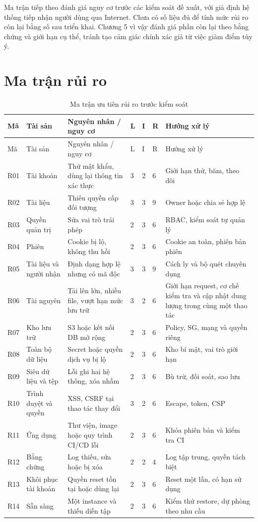 Ma trận tiếp theo đánh giá nguy cơ trước các kiểm soát đề xuất, với giả định hệ thống tiếp nhận người dùng qua Internet. Chưa có số liệu đủ để tính mức rủi ro còn lại bằng số sau triển khai. Chương 5 vì vậy đánh giá phần còn lại theo bằng chứng và giới hạn cụ thể, tránh tạo cảm giác chính xác giả từ việc giảm điểm tùy ý.

\section{Ma trận rủi ro}
{\small
\begin{longtable}{P{.8cm}P{2.7cm}P{4.2cm}P{.5cm}P{.5cm}P{.5cm}P{3.5cm}}
\caption{Ma trận ưu tiên rủi ro trước kiểm soát}\label{tab:risk}\\
\toprule Mã & Tài sản & Nguyên nhân / nguy cơ & L & I & R & Hướng xử lý\\\midrule\endfirsthead
\toprule Mã & Tài sản & Nguyên nhân / nguy cơ & L & I & R & Hướng xử lý\\\midrule\endhead
R01 & Tài khoản & Thử mật khẩu, dùng lại thông tin xác thực & 3&2&6&Giới hạn thử, băm, theo dõi\\
R02 & Tài liệu & Thiếu quyền cấp đối tượng & 3&3&9&Owner hoặc chia sẻ hợp lệ\\
R03 & Quyền quản trị & Sửa vai trò trái phép & 2&3&6&RBAC, kiểm soát tự quản lý\\
R04 & Phiên & Cookie bị lộ, không thu hồi & 2&3&6&Cookie an toàn, phiên bản phiên\\
R05 & Tài liệu và người nhận & Định dạng hợp lệ nhưng có mã độc & 3&3&9&Cách ly và bộ quét chuyên dụng\\
R06 & Tài nguyên & Tải lên lớn, nhiều file, vượt hạn mức lưu trữ & 3&2&6&Giới hạn request, cơ chế kiểm tra và cập nhật dung lượng trong cùng một thao tác\\
R07 & Kho lưu trữ & S3 hoặc kết nối DB mở rộng & 2&3&6&Policy, SG, mạng và quyền riêng\\
R08 & Toàn bộ dữ liệu & Secret hoặc quyền dịch vụ bị lộ & 2&3&6&Kho bí mật, vai trò giới hạn\\
R09 & Siêu dữ liệu và tệp & Lỗi ghi hai hệ thống, xóa nhầm & 2&3&6&Bù trừ, đối soát, sao lưu\\
R10 & Trình duyệt và quyền & XSS, CSRF tại thao tác thay đổi & 3&2&6&Escape, token, CSP\\
R11 & Ứng dụng & Thư viện, image hoặc quy trình CI/CD lỗi & 2&3&6&Khóa phiên bản và kiểm tra CI\\
R12 & Bằng chứng & Log thiếu, sửa hoặc bị xóa & 2&2&4&Log tập trung, quyền tách biệt\\
R13 & Khôi phục tài khoản & Quyền reset tồn tại hoặc dùng lại & 2&3&6&Reset một lần, có hạn sử dụng\\
R14 & Sẵn sàng & Một instance và thiếu diễn tập & 2&3&6&Kiểm thử restore, dự phòng theo nhu cầu\\
\bottomrule
\end{longtable}}
